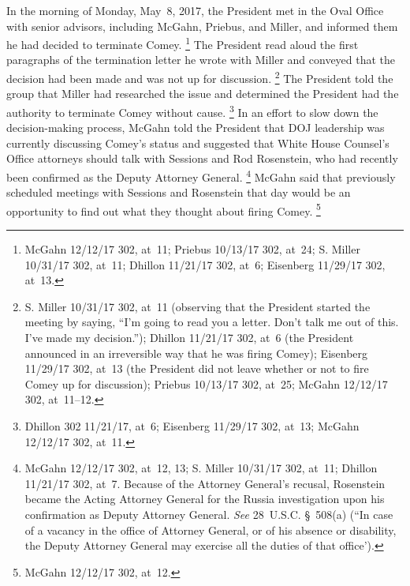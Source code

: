 In the morning of Monday, May~8, 2017, the President met in the Oval Office with senior advisors, including McGahn, Priebus, and Miller, and informed them he had decided to terminate Comey.%
\footnote{McGahn 12/12/17 302, at~11;
Priebus 10/13/17 302, at~24;
S. Miller 10/31/17 302, at~11;
Dhillon 11/21/17 302, at~6;
Eisenberg 11/29/17 302, at~13.}
The President read aloud the first paragraphs of the termination letter he wrote with Miller and conveyed that the decision had been made and was not up for discussion.%
\footnote{S. Miller 10/31/17 302, at~11 (observing that the President started the meeting by saying, ``I'm going to read you a letter.
Don't talk me out of this.
I've made my decision.'');
Dhillon 11/21/17 302, at~6 (the President announced in an irreversible way that he was firing Comey);
Eisenberg 11/29/17 302, at~13 (the President did not leave whether or not to fire Comey up for discussion);
Priebus 10/13/17 302, at~25;
McGahn 12/12/17 302, at~11--12.}
The President told the group that Miller had researched the issue and determined the President had the authority to terminate Comey without cause.%
\footnote{Dhillon 302 11/21/17, at~6;
Eisenberg 11/29/17 302, at~13;
McGahn 12/12/17 302, at~11.}
In an effort to slow down the decision-making process, McGahn told the President that DOJ leadership was currently discussing Comey's status and suggested that White House Counsel's Office attorneys should talk with Sessions and Rod Rosenstein, who had recently been confirmed as the Deputy Attorney General.%
\footnote{McGahn 12/12/17 302, at~12, 13;
S. Miller 10/31/17 302, at~11;
Dhillon 11/21/17 302, at~7.
Because of the Attorney General's recusal, Rosenstein became the Acting Attorney General for the Russia investigation upon his confirmation as Deputy Attorney General.
\textit{See} 28~U.S.C. \S~508(a) (``In case of a vacancy in the office of Attorney General, or of his absence or disability, the Deputy Attorney General may exercise all the duties of that office').}
McGahn said that previously scheduled meetings with Sessions and Rosenstein that day would be an opportunity to find out what they thought about firing Comey.%
\footnote{McGahn 12/12/17 302, at~12.}

